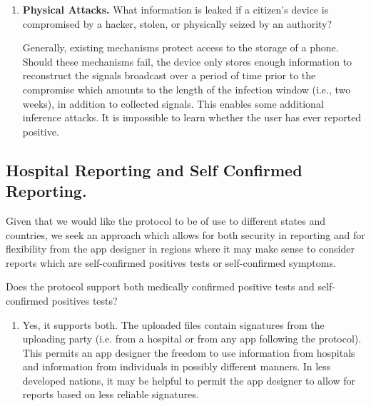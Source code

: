 \documentclass{article}
\newcommand{\sk}[1]{\textsf{\color{magenta} SK: #1}}
\begin{document}
\begin{enumerate}[leftmargin=*]
    \item \textbf{Physical Attacks.} What information is leaked if a citizen's device is compromised by a hacker, stolen, or physically seized by an authority?
    
    Generally, existing mechanisms protect access to the storage of a phone. Should these mechanisms fail, the device only stores enough information to reconstruct the signals broadcast over a period of time prior to the compromise which amounts  to the length of the infection window (i.e., two weeks), in addition to collected signals. This enables some additional inference attacks. It is impossible to learn whether the user has ever reported positive. 

\end{enumerate}

\subsection{Hospital Reporting and Self Confirmed Reporting.} 
Given that we would like the protocol to be of use to different states and countries, we seek an approach which allows for both security in reporting and for flexibility from the app designer in regions where it may make sense to  consider reports which are self-confirmed positives tests or self-confirmed symptoms.

Does the protocol support both medically confirmed positive tests and self-confirmed positives tests?
\begin{enumerate}[leftmargin=*]

\item Yes, it supports both. The uploaded files contain signatures from the uploading party (i.e. from a hospital or from any app following the protocol). This permits an app designer the freedom to use information from hospitals and information from individuals in possibly different manners. In less developed nations, it may be helpful to permit the app designer to allow for reports based on less reliable signatures. 

\end{enumerate}
\end{document}
